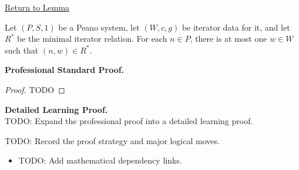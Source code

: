 \newpage
{}
\label{prf:minimal-iterator-relation-deterministic}

\begin{remark*}[Return]
\hyperref[lem:minimal-iterator-relation-deterministic]{Return to Lemma}
\end{remark*}

\begin{theorem*}
Let $(P,S,1)$ be a Peano system, let $(W,c,g)$ be iterator data for it, and let
$R^*$ be the minimal iterator relation. For each $n\in P$, there is at most one
$w\in W$ such that $(n,w)\in R^*$.
\end{theorem*}

\textbf{Professional Standard Proof.}~\\
\begin{proof}
TODO
\end{proof}

\textbf{Detailed Learning Proof.}~\\
TODO: Expand the professional proof into a detailed learning proof.

\begin{remark*}
TODO: Record the proof strategy and major logical moves.
\end{remark*}

\begin{dependencies}
\begin{itemize}
  \item TODO: Add mathematical dependency links.
\end{itemize}
\end{dependencies}
